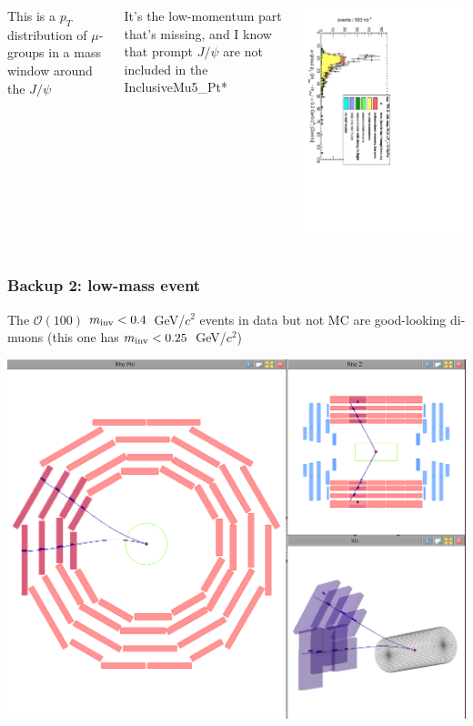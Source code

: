 \documentclass[compress]{beamer}
\newcommand{\s}[1]{{\mbox{\scriptsize #1}}}
\begin{document}
\begin{frame}
\begin{columns}
This is a $p_T$ distribution of $\mu$-groups in a mass window around the $J/\psi$

\vspace{0.1 cm}
{\scriptsize It's the low-momentum part that's missing, and I know
  that prompt $J/\psi$ are not included in the InclusiveMu5\_Pt*}

\vspace{0.25 cm}
\includegraphics[height=\linewidth, angle=90]{Mu9_pt_jpsi.pdf}
\end{columns}
\end{frame}

\begin{frame}
\frametitle{Backup 2: low-mass event}

The $\mathcal{O}(100)$ $m_\s{inv} < 0.4$~GeV/$c^2$ events in data but not MC are
good-looking di-muons (this one has $m_\s{inv} < 0.25$~GeV/$c^2$)

\vspace{0.25 cm}
\includegraphics[width=0.9\linewidth]{low-mass_perfectly-normal_2.png}
\end{frame}
\end{document}
